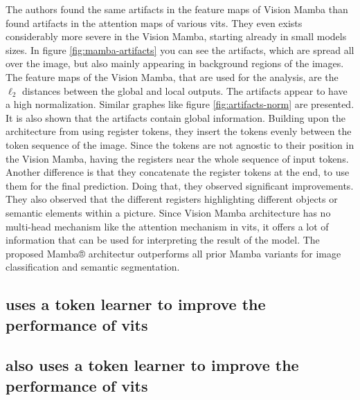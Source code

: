 \documentclass[conference]{IEEEtran}
\begin{document}
  The authors found the same artifacts in the feature maps of Vision Mamba than \citeauthor{registers} found artifacts in the attention maps of various \acp{vit}. They even exists considerably more severe in the Vision Mamba, starting already in small models sizes. In figure \ref{fig:mamba-artifacts} you can see the artifacts, which are spread all over the image, but also mainly appearing in background regions of the images. The feature maps of the Vision Mamba, that are used for the analysis, are the $\ell_2$ distances between the global and local outputs. The artifacts appear to have a high normalization. Similar graphes like figure \ref{fig:artifacts-norm} are presented. It is also shown that the artifacts contain global information. Building upon the architecture from \cite{registers} using register tokens, they insert the tokens evenly between the token sequence of the image. Since the tokens are not agnostic to their position in the Vision Mamba, having the registers near the whole sequence of input tokens. Another difference is that they concatenate the register tokens at the end, to use them for the final prediction. Doing that, they observed significant improvements. They also observed that the different registers highlighting different objects or semantic elements within a picture. Since Vision Mamba architecture has no multi-head mechanism like the attention mechanism in \acp{vit}, it offers a lot of information that can be used for interpreting the result of the model. The proposed Mamba® architectur outperforms all prior Mamba variants for image classification and semantic segmentation. \cite{mamba-needs-registers}


  \subsection{\cite{sum-tokens-to-registers} uses a token learner to improve the performance of \ac{vit}s}

  \subsection{\cite{token-learner} also uses a token learner to improve the performance of \ac{vit}s}
\end{document}
